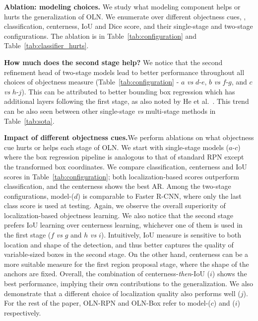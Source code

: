 \documentclass[10pt,twocolumn,letterpaper]{article}
\newcommand{\tableref}[1]{Table~\ref{#1}}
\renewcommand{\paragraph}[1]{\vspace{1mm}\noindent\textbf{#1}}
\begin{document}
\paragraph{{Ablation: modeling choices.}}\quad
We study what modeling component helps or hurts the generalization of OLN. We enumerate over different objectness cues, \ie, classification, centerness, IoU and Dice score, and their single-stage and two-stage configurations. The ablation is in \tableref{tab:configuration} and \tableref{tab:classifier_hurts}. 

\paragraph{{How much does the second stage help?}}\quad 
We notice that the second refinement head of two-stage models lead to better performance throughout all choices of objectness measure (\tableref{tab:configuration} - $a$ \textit{vs} $d$-$e$,  $b$ \textit{vs} $f$-$g$, and $c$ \textit{vs} $h$-$j$). This can be attributed to better bounding box regression which has additional layers following the first stage, as also noted by He et al.~\cite{he2017mask}. This trend can be also seen between other single-stage \textit{vs} multi-stage methods in \tableref{tab:sota}. 


\paragraph{{Impact of different objectness cues.}}\quad We perform ablations on what objectness cue hurts or helps each stage of OLN. We start with single-stage models ($a$-$c$) where the box regression pipeline is analogous to that of standard RPN except the transformed box coordinates. We compare classification, centerness and IoU scores in \tableref{tab:configuration}; both localization-based scores outperform classification, and the centerness shows the best AR. Among the two-stage configurations, model-($d$) is comparable to Faster R-CNN, where only the last class score is used at testing. Again, we observe the overall superiority of localization-based objectness learning. We also notice that the second stage prefers IoU learning over centerness learning, whichever one of them is used in the first stage ($f$ \textit{vs} $g$ and $h$ \textit{vs} $i$). Intuitively, IoU measure is sensitive to both location and shape of the detection, and thus better captures the quality of variable-sized boxes in the second stage. On the other hand, centerness can be a more suitable measure for the first region proposal stage, where the shape of the anchors are fixed. Overall, the combination of centerness-\textit{then}-IoU ($i$) shows the best performance, implying their own contributions to the generalization. We also demonstrate that a different choice of localization quality also performs well ($j$). For the rest of the paper, OLN-RPN and OLN-Box refer to model-($c$) and ($i$) respectively.
\end{document}
